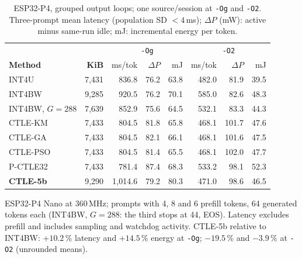 
\begin{table}[t]
\centering
\footnotesize
\caption{ESP32-P4, grouped output loops; one source/session at \texttt{-Og}
and \texttt{-O2}. Three-prompt mean latency (population SD $<4$\,ms); $\Delta P$
(mW): active minus same-run idle; mJ: incremental energy per token.}
\label{tab:hw}
\setlength{\tabcolsep}{2.6pt}
\renewcommand{\arraystretch}{1.1}
\begin{tabular}{lrrrrrrr}
\toprule
 & & \multicolumn{3}{c}{\texttt{-Og}} & \multicolumn{3}{c}{\texttt{-O2}} \\
\textbf{Method} & \textbf{KiB} & ms/tok & $\Delta P$ & mJ & ms/tok & $\Delta P$ & mJ \\
\midrule
INT4U & 7{,}431 & 836.8 & 76.2 & 63.8 & 482.0 & 81.9 & 39.5 \\
INT4BW & 9{,}285 & 920.5 & 76.2 & 70.1 & 585.0 & 82.6 & 48.3 \\
INT4BW, $G{=}288$ & 7{,}639 & 852.9 & 75.6 & 64.5 & 532.1 & 83.3 & 44.3 \\
\midrule
CTLE-KM & 7{,}433 & 804.5 & 81.8 & 65.8 & 468.1 & 101.7 & 47.6 \\
CTLE-GA & 7{,}433 & 804.5 & 82.1 & 66.1 & 468.1 & 101.6 & 47.5 \\
CTLE-PSO & 7{,}433 & 804.5 & 81.4 & 65.5 & 468.1 & 102.0 & 47.7 \\
P-CTLE32 & 7{,}433 & 781.4 & 87.4 & 68.3 & 533.2 & 98.1 & 52.3 \\
\textbf{CTLE-5b} & 9{,}290 & 1{,}014.6 & 79.2 & 80.3 & 471.0 & 98.6 & 46.5 \\
\bottomrule
\end{tabular}
\smallskip
\begin{minipage}{0.98\columnwidth}
  \footnotesize
  ESP32-P4 Nano at 360\,MHz; prompts with 4, 8 and 6 prefill tokens, 64
  generated tokens each (INT4BW, $G{=}288$: the third stops at 44, EOS).
  Latency excludes prefill and includes sampling and watchdog activity.
  CTLE-5b relative to INT4BW: $+10.2$\,\% latency and $+14.5$\,\% energy at
  \texttt{-Og}; $-19.5$\,\% and $-3.9$\,\% at \texttt{-O2} (unrounded means).
\end{minipage}
\end{table}
